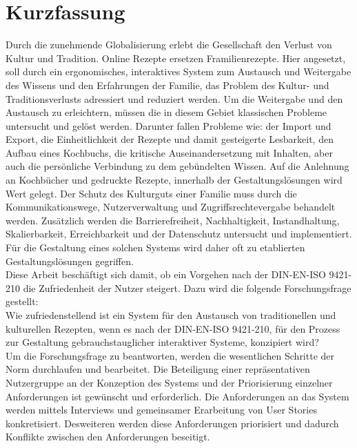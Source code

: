\chapter*{Kurzfassung}
Durch die zunehmende Globalisierung erlebt die Gesellschaft den Verlust von Kultur und Tradition. Online Rezepte ersetzen Framilienrezepte. Hier angesetzt, soll durch ein ergonomisches, interaktives System zum Austausch und Weitergabe des Wissens und den Erfahrungen der Familie, das Problem des Kultur- und Traditionsverlusts adressiert und reduziert werden. Um die Weitergabe und den Austausch zu erleichtern, müssen die in diesem Gebiet klassischen Probleme untersucht und gelöst werden. Darunter fallen Probleme wie: der Import und Export, die Einheitlichkeit der Rezepte und damit gesteigerte Lesbarkeit, den Aufbau eines Kochbuchs, die kritische Auseinandersetzung mit Inhalten, aber auch die persönliche Verbindung zu dem gebündelten Wissen. Auf die Anlehnung an Kochbücher und gedruckte Rezepte, innerhalb der Gestaltungslösungen wird Wert gelegt. Der Schutz des Kulturguts einer Familie muss durch die Kommunikationswege, Nutzerverwaltung und Zugriffsrechtevergabe behandelt werden. Zusätzlich werden die Barrierefreiheit, Nachhaltigkeit, Instandhaltung, Skalierbarkeit, Erreichbarkeit und der Datenschutz untersucht und implementiert. Für die Gestaltung eines solchen Systems wird daher oft zu etablierten Gestaltungslösungen gegriffen.\\

Diese Arbeit beschäftigt sich damit, ob ein Vorgehen nach der DIN-EN-ISO 9421-210 die Zufriedenheit der Nutzer steigert. Dazu wird die folgende Forschungsfrage gestellt: \\
Wie zufriedenstellend ist ein System für den Austausch von traditionellen und kulturellen Rezepten, wenn es nach der DIN-EN-ISO 9421-210, für den Prozess zur Gestaltung gebrauchstauglicher interaktiver Systeme, konzipiert wird? \\

Um die Forschungsfrage zu beantworten, werden die wesentlichen Schritte der Norm durchlaufen und bearbeitet. Die Beteiligung einer repräsentativen Nutzergruppe an der Konzeption des Systems und der Priorisierung einzelner Anforderungen ist gewünscht und erforderlich. Die Anforderungen an das System werden mittels Interviews und gemeinsamer Erarbeitung von User Stories konkretisiert. Desweiteren werden diese Anforderungen priorisiert und dadurch Konflikte zwischen den Anforderungen beseitigt. \\

